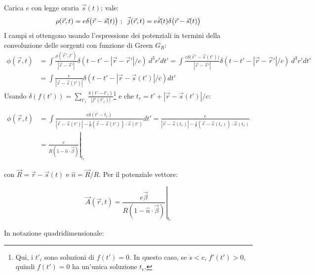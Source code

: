 \documentclass[10pt, a4paper]{scrartcl}
\newcommand*\Eval[3]{\left.#1\right\rvert_{#2}^{#3}}
\numberwithin{equation}{subsection}
\theoremstyle{style1}
\newenvironment{boxenv}[1][]{
    \begin{eqbox}[#1]
    }{
   \end{eqbox}
}
\begin{document}
Carica $e$ con legge oraria $\vec{s}(t)$; vale:
\[
	\rho (\vec{r},t) = e \delta \big(\vec{r}-\vec{s}(t)\big) \ ; \hspace{.2cm} \vec{j}(\vec{r},t) = e\dot{\vec{s}}(t) \delta \big(\vec{r}-\vec{s}(t)\big)
\] 
I campi si ottengono usando l'espressione dei potenziali in termini della convoluzione delle sorgenti con funzione di Green $G_R$:
\begin{equation*}
	\begin{split}
		\phi (\vec{r},t) &= \int \frac{\rho (\vec{r}',t')}{\left\lvert \vec{r}-\vec{r}' \right\rvert } \delta (t-t'-\left\lvert \vec{r} - \vec{r}'\right\rvert /c)\ d^3 r' dt' = \int \frac{e \delta \big(\vec{r}'-\vec{s}(t')\big)}{\left\lvert \vec{r}-\vec{r}' \right\rvert }\delta (t-t'-\left\lvert \vec{r} - \vec{r}'\right\rvert /c)\ d^3 r' dt'\\
		&=\int \frac{e}{\left\lvert \vec{r}- \vec{s}(t') \right\rvert } \delta (t-t'- \left\lvert \vec{r}-\vec{s}(t') \right\rvert /c ) dt'
	\end{split}
\end{equation*}
Usando $\delta (f(t')) = \sum_{t'_i}^{} \frac{\delta (t'-t'_i)}{\left\lvert f'(t'_i) \right\rvert }$\footnote{Qui, i $t'_i$ sono soluzioni di $f(t') = 0$. In questo caso, se $\dot{s}<c$, $f'(t')>0$, quindi $f(t')=0$ ha un'unica soluzione $t_r$.} e che $t_r = t' + \left\lvert \vec{r}-\vec{s}(t') \right\rvert / c$:
\begin{boxenv}[]
\begin{equation}
	\begin{split}
		\phi (\vec{r},t) &= \int \frac{e\delta (t' - t_r)}{\left\lvert \vec{r}-\vec{s}(t') \right\rvert -\frac{1}{c} (\vec{r}-\vec{s}(t'))\cdot \dot{\vec{s}}(t') } dt'= \frac{e}{\left\lvert \vec{r}- \vec{s}(t_r)  \right\rvert - \frac{1}{c}(\vec{r}-\vec{s}(t_r))\cdot \dot{\vec{s}}(t_r)} \\
				 &= \Eval{\frac{e}{R(1-\hat{n}\cdot \vec{\beta })}}{t_r}{}
	\end{split}
\end{equation}
\end{boxenv}
\noindent con $\vec{R} = \vec{r}-\vec{s}(t)$ e $\hat{n}= \vec{R} / R$. Per il potenziale vettore:
\begin{boxenv}[]
\begin{equation}
	\vec{A}(\vec{r},t) = \Eval{\frac{e \vec{\beta }}{R ( 1- \hat{n}\cdot \vec{\beta })}}{t_r}{}
\end{equation}
\end{boxenv}
\noindent In notazione quadridimensionale:
\end{document}
